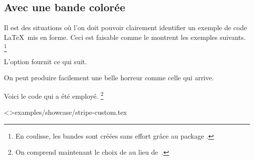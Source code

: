 \documentclass{../main/main}
\begin{document}
\subsection{Avec une bande colorée}

Il est des situations où l'on doit pouvoir clairement identifier un exemple de code \LaTeX\ mis en forme. Ceci est faisable comme le montrent les exemples suivants.%
\footnote{
    En coulisse, les bandes sont créées sans effort grâce au package .
}


\begin{tdocexa}
	L'option  fournit ce qui suit.

	
\end{tdocexa}


\begin{tdocexa}
	On peut produire facilement une belle horreur comme celle qui arrive.

	

	Voici le code qui a été employé.%
	\footnote{
		On comprend maintenant le choix de  au lieu de \,.
	}

	\tdoclatexinput<>{examples/showcase/stripe-custom.tex}
\end{tdocexa}
\end{document}
